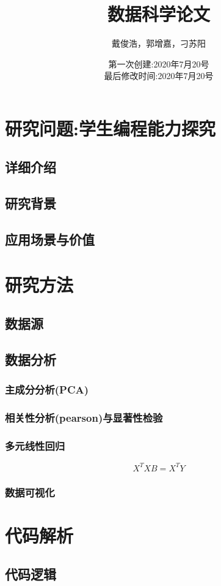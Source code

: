 \documentclass[12pt,UTF-8,a4paper]{ctexart}
\title{数据科学论文}
\author{\small 戴俊浩，郭增嘉，刁苏阳}
\date{\small 第一次创建:2020年7月20号\\最后修改时间:2020年7月20号}
\begin{document}
\maketitle
\section{研究问题:学生编程能力探究}
\subsection{详细介绍}
\subsection{研究背景}
\subsection{应用场景与价值}
\section{研究方法}
\subsection{数据源}
\subsection{数据分析}
\subsubsection{主成分分析(PCA)}
\subsubsection{相关性分析(pearson)与显著性检验}
\subsubsection{多元线性回归}
$$X^TXB=X^TY$$
\subsubsection{数据可视化}
\section{代码解析}
\subsection{代码逻辑}
\end{document}
